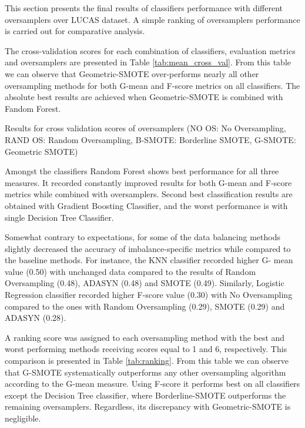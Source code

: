 \documentclass[parskip=full]{scrartcl}
\begin{document}
This section presents the final results of classifiers performance with
different oversamplers over LUCAS dataset. A simple ranking of oversamplers
performance is carried out for comparative analysis.

The cross-validation scores for each combination of classifiers, evaluation
metrics and oversamplers are presented in Table \ref{tab:mean_cross_val}. From
this table we can observe that Geometric-SMOTE over-performs nearly all other
oversampling methods for both G-mean and F-score metrics on all classifiers. The
absolute best results are achieved when Geometric-SMOTE is combined with Fandom
Forest.

\begin{table}[H]
	\centering
	\caption{\label{tab:mean_cross_val}Results for cross validation scores of
		oversamplers (NO OS: No Oversampling, RAND OS: Random Oversampling,
		B-SMOTE: Borderline SMOTE, G-SMOTE: Geometric SMOTE)}
\end{table}

Amongst the classifiers Random Forest shows best performance for all three
measures. It recorded constantly improved results for both G-mean and F-score
metrics while combined with oversamplers. Second best classification results are
obtained with Gradient Boosting Classifier, and the worst performance is with
single Decision Tree Classifier.

Somewhat contrary to expectations, for some of the data balancing methods
slightly decreased the accuracy of imbalance-specific metrics while compared to
the baseline methods. For instance, the KNN classifier recorded higher G- mean
value (0.50) with unchanged data compared to the results of Random Oversampling
(0.48), ADASYN (0.48) and SMOTE (0.49). Similarly, Logistic Regression
classifier recorded higher F-score value (0.30) with No Oversampling compared to
the ones with Random Oversampling (0.29), SMOTE (0.29) and ADASYN (0.28).

A ranking score was assigned to each oversampling method with the best and worst
performing methods receiving scores equal to 1 and 6, respectively. This
comparison is presented in Table \ref{tab:ranking}. From this table we can
observe that G-SMOTE systematically outperforms any other oversampling algorithm
according to the G-mean measure. Using F-score it performs best on all
classifiers except the Decision Tree classifier, where Borderline-SMOTE
outperforms the remaining oversamplers. Regardless, its discrepancy with
Geometric-SMOTE is negligible.
\end{document}
